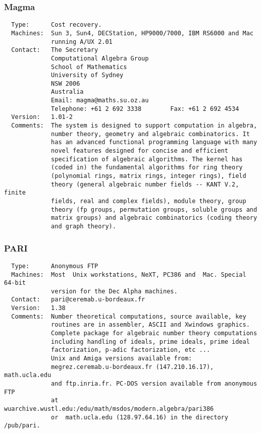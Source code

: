 \subsubsection{Magma}
\begin{verbatim}
  Type:      Cost recovery.
  Machines:  Sun 3, Sun4, DECStation, HP9000/7000, IBM RS6000 and Mac
             running A/UX 2.01
  Contact:   The Secretary
             Computational Algebra Group
             School of Mathematics
             University of Sydney
             NSW 2006
             Australia
             Email: magma@maths.su.oz.au
             Telephone: +61 2 692 3338        Fax: +61 2 692 4534
  Version:   1.01-2
  Comments:  The system is designed to support computation in algebra,
             number theory, geometry and algebraic combinatorics. It
             has an advanced functional programming language with many
             novel features designed for concise and efficient
             specification of algebraic algorithms. The kernel has
             (coded in) the fundamental algorithms for ring theory
             (polynomial rings, matrix rings, integer rings), field
             theory (general algebraic number fields -- KANT V.2, finite
             fields, real and complex fields), module theory, group
             theory (fp groups, permutation groups, soluble groups and
             matrix groups) and algebraic combinatorics (coding theory
             and graph theory).
\end{verbatim}

\subsubsection{PARI}
\begin{verbatim}
  Type:      Anonymous FTP
  Machines:  Most  Unix workstations, NeXT, PC386 and  Mac. Special 64-bit
             version for the Dec Alpha machines.
  Contact:   pari@ceremab.u-bordeaux.fr
  Version:   1.38
  Comments:  Number theoretical computations, source available, key
             routines are in assembler, ASCII and Xwindows graphics.
             Complete package for algebraic number theory computations
             including handling of ideals, prime ideals, prime ideal
             factorization, p-adic factorization, etc ...
             Unix and Amiga versions available from:
             megrez.ceremab.u-bordeaux.fr (147.210.16.17), math.ucla.edu
             and ftp.inria.fr. PC-DOS version available from anonymous FTP
             at wuarchive.wustl.edu:/edu/math/msdos/modern.algebra/pari386
             or  math.ucla.edu (128.97.64.16) in the directory /pub/pari.
\end{verbatim}

